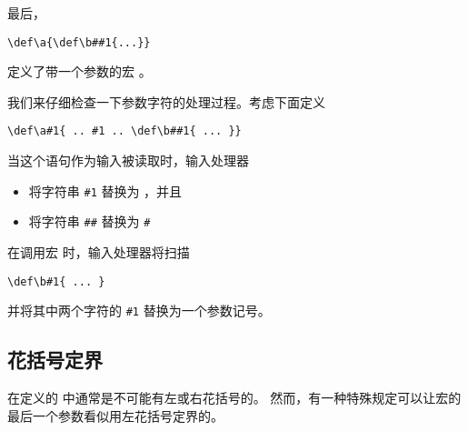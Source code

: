 \documentclass{book}
\begin{document}
最后，
\begin{verbatim}
\def\a{\def\b##1{...}}
\end{verbatim}
定义了带一个参数的宏 。

我们来仔细检查一下参数字符的处理过程。考虑下面定义
\begin{verbatim}
\def\a#1{ .. #1 .. \def\b##1{ ... }}
\end{verbatim}
当这个语句作为输入被读取时，输入处理器
\begin{itemize}
\item 将字符串 \verb>#1> 替换为 ，并且
\item 将字符串 \verb>##> 替换为 \verb>#>
\end{itemize}
在调用宏  时，输入处理器将扫描
\begin{verbatim}
\def\b#1{ ... }
\end{verbatim}
并将其中两个字符的 \verb>#1> 替换为一个参数记号。

\subsection{花括号定界}

在定义的  中通常是不可能有左或右花括号的。
然而，有一种特殊规定可以让宏的最后一个参数看似用左花括号定界的。
\end{document}
